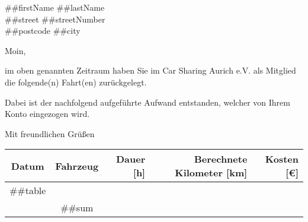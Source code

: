 \documentclass[
	pagenumber=false, %
	parskip=half, %
	fromalign=right, %
	foldmarks=true, %
	addrfield=true %
	firstfoot=on %
    ]{scrlttr2}
\date{ ##settlementDate } %
\begin{document}
 
\begin{letter}{ ##firstName ##lastName \\ ##street ##streetNumber\\ ##postcode ##city } %


\opening{Moin,}

im oben genannten Zeitraum haben Sie im Car Sharing Aurich e.V. als Mitglied die folgende(n) Fahrt(en) zurückgelegt.

Dabei ist der nachfolgend aufgeführte Aufwand entstanden, welcher von Ihrem Konto eingezogen wird.

\closing{Mit freundlichen Grüßen}




\newpage
\begin{tabular}{ | c | c | r | r | r | }
\hline
Datum & Fahrzeug & Dauer [h] & Berechnete Kilometer [km]& Kosten [\euro{}]\\ \hline
##table\\
\hhline{|-|-|-|-|=|}
\multicolumn{4}{|r|}{Summe:} &##sum\\\hline
\end{tabular}

\end{letter}
\end{document}
